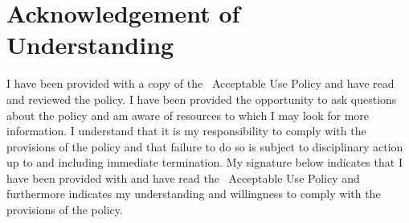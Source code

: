 \documentclass[use]{policy}
\begin{document}
	\section{Acknowledgement of Understanding}
		I have been provided with a copy of the \theOrganization\  Acceptable Use Policy and have read and reviewed the policy.  I have been provided the opportunity to ask questions about the policy and am aware of resources to which I may look for more information.  I understand that it is my responsibility to comply with the provisions of the policy and that failure to do so is subject to disciplinary action up to and including immediate termination.  My signature below indicates that I have been provided with and have read the \theOrganization\  Acceptable Use Policy and furthermore indicates my understanding and willingness to comply with the provisions of the policy.
	
		\signblock
			
\end{document}
